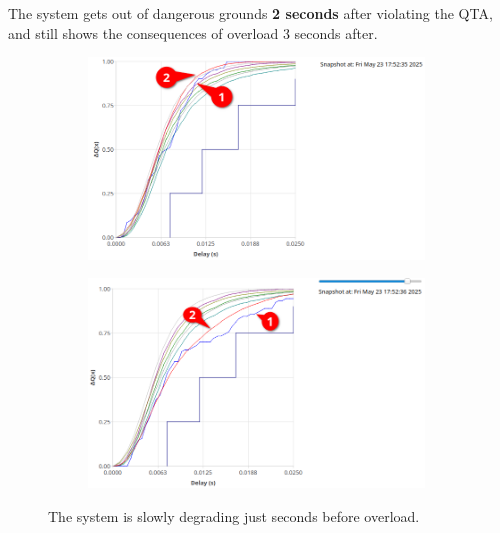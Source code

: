             The system gets out of dangerous grounds \textbf{2 seconds} after violating the QTA, and still shows the consequences of overload 3 seconds after.

        \begin{figure}[H]
            \centering
            \begin{subfigure}{.5\textwidth}
                \centering
                \includegraphics[width=0.98\textwidth]{img/return_2g1.png}
                \label{fig:appr_ov_2}
            \end{subfigure}%
            \begin{subfigure}{.5\textwidth}
                \centering
                \includegraphics[width =0.98\textwidth]{img/bad_after1.png}
                \label{fig:appr_ov}
            \end{subfigure}
            \label{fig:appr_ov_t}
            \caption{The system is slowly degrading just seconds before overload.}
            \end{figure}
            
    
